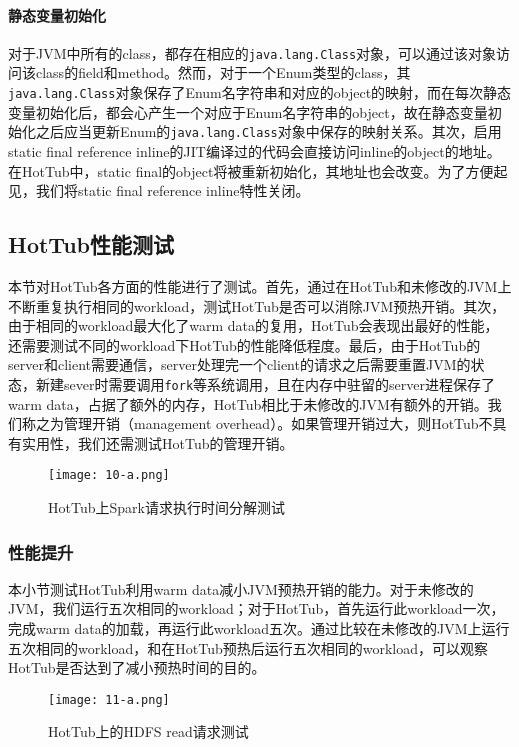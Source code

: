 \documentclass[lang=cn,12pt,a4paper,cite=authoryear]{elegantpaper}
\begin{document}
\begin{figure*}[!htp]
\paragraph{静态变量初始化} 对于JVM中所有的class，都存在相应的\texttt{java.lang.Class}对象，可以通过该对象访问该class的field和method。然而，对于一个Enum类型的class，其\texttt{java.lang.Class}对象保存了Enum名字符串和对应的object的映射，而在每次静态变量初始化后，都会心产生一个对应于Enum名字符串的object，故在静态变量初始化之后应当更新Enum的\texttt{java.lang.Class}对象中保存的映射关系。其次，启用static final reference inline的JIT编译过的代码会直接访问inline的object的地址。在HotTub中，static final的object将被重新初始化，其地址也会改变。为了方便起见，我们将static final reference inline特性关闭。

\subsection{HotTub性能测试}
本节对HotTub各方面的性能进行了测试。首先，通过在HotTub和未修改的JVM上不断重复执行相同的workload，测试HotTub是否可以消除JVM预热开销。其次，由于相同的workload最大化了warm data的复用，HotTub会表现出最好的性能，还需要测试不同的workload下HotTub的性能降低程度。最后，由于HotTub的server和client需要通信，server处理完一个client的请求之后需要重置JVM的状态，新建sever时需要调用\texttt{fork}等系统调用，且在内存中驻留的server进程保存了warm data，占据了额外的内存，HotTub相比于未修改的JVM有额外的开销。我们称之为管理开销（management overhead）。如果管理开销过大，则HotTub不具有实用性，我们还需测试HotTub的管理开销。

\begin{figure}[!htp]
  \centering
  \texttt{[image: 10-a.png]}
  \caption{HotTub上Spark请求执行时间分解测试}
  \label{fig:aaa}
\end{figure}

\subsubsection{性能提升}
本小节测试HotTub利用warm data减小JVM预热开销的能力。对于未修改的JVM，我们运行五次相同的workload；对于HotTub，首先运行此workload一次，完成warm data的加载，再运行此workload五次。通过比较在未修改的JVM上运行五次相同的workload，和在HotTub预热后运行五次相同的workload，可以观察HotTub是否达到了减小预热时间的目的。

\begin{figure}[!htp]
  \centering
  \texttt{[image: 11-a.png]}
  \caption{HotTub上的HDFS read请求测试}
  \label{fig:bbb}
\end{figure}


\end{figure*}
\end{document}
